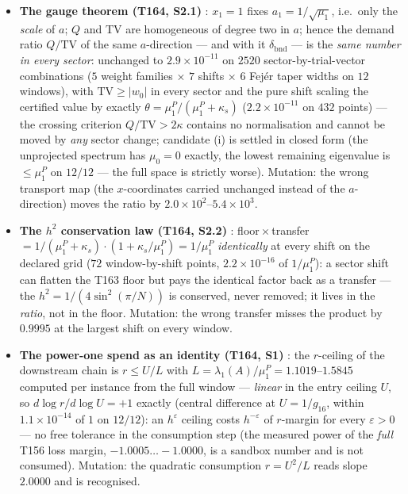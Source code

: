 \documentclass[11pt,a4paper]{article}
\begin{document}
\begin{itemize}[leftmargin=1.5em]
\item \textbf{The gauge theorem (T164, S2.1)} \mE: $x_1=1$ fixes $a_1=1/\sqrt{\mu_1}$,
i.e.\ only the \emph{scale} of $a$; $Q$ and TV are homogeneous of degree two in $a$;
hence the demand ratio $Q/\mathrm{TV}$ of the same $a$-direction --- and with it
$\delta_{\mathrm{bnd}}$ --- is the \emph{same number in every sector}: unchanged to
$2.9\times10^{-11}$ on $2520$ sector-by-trial-vector combinations ($5$ weight families
$\times$ $7$ shifts $\times$ $6$ Fej\'er taper widths on $12$ windows), with
$\mathrm{TV}\ge|w_0|$ in every sector and the pure shift scaling the certified value by
exactly $\theta=\mu^P_1/(\mu^P_1+\kappa_s)$ ($2.2\times10^{-11}$ on $432$ points) ---
the crossing criterion $Q/\mathrm{TV}>2\kappa$ contains no normalisation and cannot be
moved by \emph{any} sector change; candidate (i) is settled in closed form (the
unprojected spectrum has $\mu_0=0$ exactly, the lowest remaining eigenvalue is
$\le\mu^P_1$ on $12/12$ --- the full space is strictly worse). Mutation: the wrong
transport map (the $x$-coordinates carried unchanged instead of the $a$-direction)
moves the ratio by $2.0\times10^{2}$--$5.4\times10^{3}$.
\item \textbf{The $h^2$ conservation law (T164, S2.2)} \mE:
floor${}\times{}$transfer $=1/(\mu^P_1+\kappa_s)\cdot(1+\kappa_s/\mu^P_1)=1/\mu^P_1$
\emph{identically} at every shift on the declared grid ($72$ window-by-shift points,
$2.2\times10^{-16}$ of $1/\mu^P_1$): a sector shift can flatten the T163 floor but pays
the identical factor back as a transfer --- the $h^2=1/(4\sin^2(\pi/N))$ is conserved,
never removed; it lives in the \emph{ratio}, not in the floor. Mutation: the wrong
transfer misses the product by $0.9995$ at the largest shift on every window.
\item \textbf{The power-one spend as an identity (T164, S1)} \mE: the $r$-ceiling of the
downstream chain is $r\le U/L$ with $L=\lambda_1(A)/\mu^P_1=1.1019$--$1.5845$ computed
per instance from the full window --- \emph{linear} in the entry ceiling $U$, so
$d\log r/d\log U=+1$ exactly (central difference at $U=1/g_{16}$, within
$1.1\times10^{-14}$ of $1$ on $12/12$): an $h^{\varepsilon}$ ceiling costs
$h^{-\varepsilon}$ of $r$-margin for every $\varepsilon>0$ --- no free tolerance in the
consumption step (the measured power of the \emph{full} T156 loss margin,
$-1.0005\ldots-1.0000$, is a sandbox number and is not consumed). Mutation: the
quadratic consumption $r=U^2/L$ reads slope $2.0000$ and is recognised.

\end{itemize}
\end{document}
